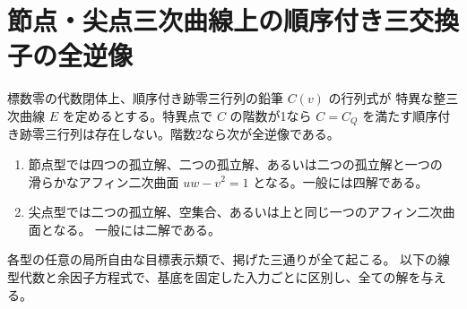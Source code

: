\section{節点・尖点三次曲線上の順序付き三交換子の全逆像}
\label{sec:marked-singular-integral-commutators}
\begin{theorem}\label{thm:marked-singular-integral-commutators}
標数零の代数閉体上、順序付き跡零三行列の鉛筆 $C(v)$ の行列式が
特異な整三次曲線 $E$ を定めるとする。特異点で $C$ の階数が1なら
$C=C_Q$ を満たす順序付き跡零三行列は存在しない。階数2なら次が全逆像である。
\begin{enumerate}
\item 節点型では四つの孤立解、二つの孤立解、あるいは二つの孤立解と一つの
滑らかなアフィン二次曲面 $uw-v^2=1$ となる。一般には四解である。
\item 尖点型では二つの孤立解、空集合、あるいは上と同じ一つのアフィン二次曲面となる。
一般には二解である。
\end{enumerate}
各型の任意の局所自由な目標表示類で、掲げた三通りが全て起こる。
以下の線型代数と余因子方程式で、基底を固定した入力ごとに区別し、全ての解を与える。
\end{theorem}
